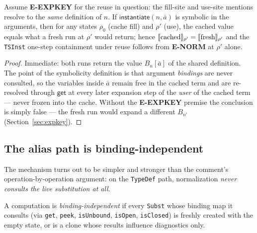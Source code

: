 \documentclass[11pt]{article}
\newcommand{\instop}{\mathsf{instantiate}}
\newcommand{\getop}{\mathsf{get}}
\begin{document}
\begin{lemma}
\label{lem:symbolic-suffices}
Assume \textbf{E-EXPKEY} for the reuse in question: the fill-site and
use-site mentions resolve to the \emph{same} definition of $n$. If
$\instop(n,\bar{a})$ is symbolic in the arguments, then for any states
$\rho_0$ (cache fill) and $\rho'$ (use), the cached value equals what a
fresh run at $\rho'$ would return; hence
$\llbracket \text{cached} \rrbracket_{\rho'} = \llbracket \text{fresh} \rrbracket_{\rho'}$ and the
\texttt{TSInst} one-step containment under reuse follows from
\textbf{E-NORM} at $\rho'$ alone.
\end{lemma}
\begin{proof}
Immediate: both runs return the value $B_n[\bar{a}]$ of the shared
definition. The point of the symbolicity definition is that argument
\emph{bindings} are never consulted, so the variables inside $\bar{a}$
remain free in the cached term and are re-resolved through $\getop$ at
every later expansion step of the \emph{user} of the cached term —
never frozen into the cache. Without the \textbf{E-EXPKEY} premise the
conclusion is simply false — the fresh run would expand a different
$B_{n'}$ (Section~\ref{sec:expkey}).
\end{proof}

\subsection{The alias path is binding-independent}

The mechanism turns out to be simpler and stronger than the comment's
operation-by-operation argument: on the \texttt{TypeDef} path,
normalization \emph{never consults the live substitution at all}.

\begin{definition}
A computation is \emph{binding-independent} if every \texttt{Subst} whose
binding map it consults (via \texttt{get}, \texttt{peek},
\texttt{isUnbound}, \texttt{isOpen}, \texttt{isClosed}) is freshly
created with the empty state, or is a clone whose results influence
diagnostics only.
\end{definition}
\end{document}
